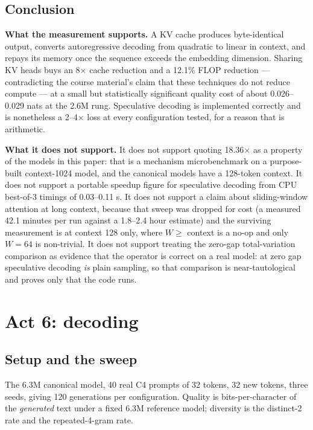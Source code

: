 \documentclass[11pt,a4paper]{article}
\begin{document}
\subsection{Conclusion}
\label{sec:act5-conclusion}

\textbf{What the measurement supports.} A KV cache produces byte-identical
output, converts autoregressive decoding from quadratic to linear in context,
and repays its memory once the sequence exceeds the embedding dimension.
Sharing KV heads buys an 8$\times$ cache reduction and a 12.1\% FLOP
reduction --- contradicting the course material's claim that these techniques do
not reduce compute --- at a small but statistically significant quality cost of
about 0.026--0.029 nats at the 2.6M rung. Speculative decoding is implemented
correctly and is nonetheless a 2--4$\times$ loss at every configuration tested,
for a reason that is arithmetic.

\textbf{What it does not support.} It does not support quoting 18.36$\times$ as
a property of the models in this paper: that is a mechanism microbenchmark on
a purpose-built context-1024 model, and the canonical models have a 128-token
context. It does not support a portable speedup figure for speculative decoding
from CPU best-of-3 timings of 0.03--0.11 s. It does not support a claim about
sliding-window attention at long context, because that sweep was dropped for
cost (a measured 42.1 minutes per run against a 1.8--2.4 hour estimate) and
the surviving measurement is at context 128 only, where $W \geq$ context is a
no-op and only $W = 64$ is non-trivial. %
 It does not support treating the
zero-gap total-variation comparison as evidence that the operator is correct
on a real model: at zero gap speculative decoding \emph{is} plain sampling, so
that comparison is near-tautological and proves only that the code runs. %


\section{Act 6: decoding}
\label{sec:act6}

\subsection{Setup and the sweep}
\label{sec:act6-setup}

The 6.3M canonical model, 40 real C4 prompts of 32 tokens, 32 new tokens,
three seeds, giving 120 generations per configuration. Quality is
bits-per-character of the \emph{generated} text under a fixed 6.3M reference
model; diversity is the distinct-2 rate and the repeated-4-gram rate.
\end{document}
